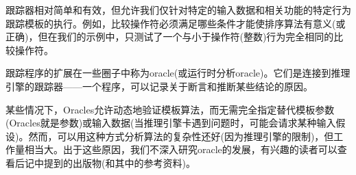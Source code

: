 跟踪器相对简单和有效，但允许我们仅针对特定的输入数据和相关功能的特定行为跟踪模板的执行。例如，比较操作符必须满足哪些条件才能使排序算法有意义(或正确)，但在我们的示例中，只测试了一个与小于操作符(整数)行为完全相同的比较操作符。

跟踪程序的扩展在一些圈子中称为oracle(或运行时分析oracle)。它们是连接到推理引擎的跟踪器——一个程序，可以记录关于断言和推断某些结论的原因。

某些情况下，Oracles允许动态地验证模板算法，而无需完全指定替代模板参数(Oracles就是参数)或输入数据(当推理引擎卡遇到问题时，可能会请求某种输入假设)。然而，可以用这种方式分析算法的复杂性还好(因为推理引擎的限制)，但工作量相当大。出于这些原因，我们不深入研究oracle的发展，有兴趣的读者可以查看后记中提到的出版物(和其中的参考资料)。